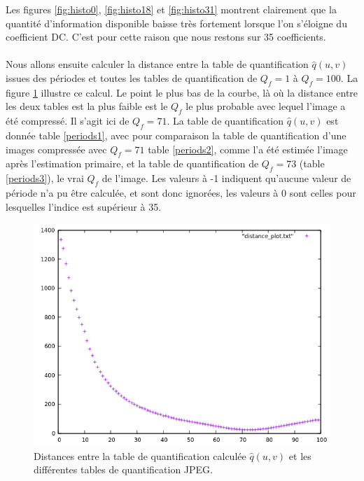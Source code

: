 \documentclass[utf8,final]{stageM2R} %
\begin{document}
Les figures \ref{fig:histo0}, \ref{fig:histo18} et \ref{fig:histo31} montrent clairement que la quantité d'information disponible baisse très fortement lorsque l'on s'éloigne du coefficient DC. C'est pour cette raison que nous restons sur 35 coefficients.

\paragraph{}
Nous allons ensuite calculer la distance entre la table de quantification $\widehat{q}(u,v)$ issues des périodes et toutes les tables de quantification de $Q_f = 1$ à $Q_f = 100$. La figure \ref{fig:distances} illustre ce calcul. Le point le plus bas de la courbe, là où la distance entre les deux tables est la plus faible est le $Q_f$ le plus probable avec lequel l'image a été compressé. Il s'agit ici de $Q_f = 71$. La table de quantification $\widehat{q}(u,v)$ est donnée table \ref{periods1}, avec pour comparaison la table de quantification d'une images compressée avec $Q_f = 71$ table \ref{periods2}, comme l'a été estimée l'image après l'estimation primaire, et la table de quantification de $Q_f = 73$ (table \ref{periods3}), le vrai $Q_f$ de l'image. Les valeurs à -1 indiquent qu'aucune valeur de période n'a pu être calculée, et sont donc ignorées, les valeurs à 0 sont celles pour lesquelles l'indice est supérieur à 35.

\begin{figure}
  \centering
  \includegraphics[width=0.7\linewidth]{images/distances}

  \caption{Distances entre la table de quantification calculée $\widehat{q}(u,v)$ et les différentes tables de quantification JPEG.}
  \label{fig:distances}
\end{figure}
\end{document}
